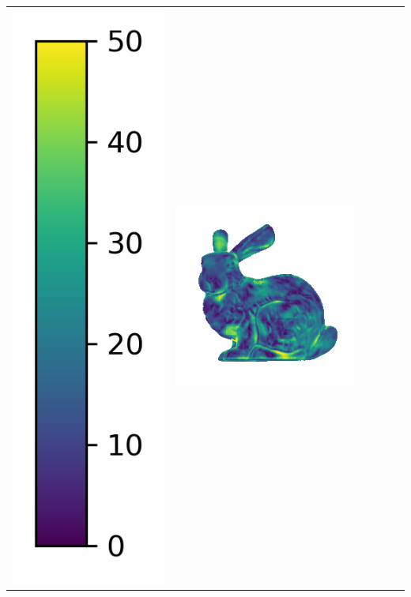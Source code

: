 \begin{tabularx}{\linewidth}{@{}Y@{}Y@{}Y@{}Y@{}Y@{}Y@{}}
\includegraphics[width=0.2\linewidth]{semisynthetic/colorbar_error_vertical.png} &
\includegraphics[width=\linewidth]{semisynthetic/20160617_14_ours_err.png} &

\end{tabularx}
